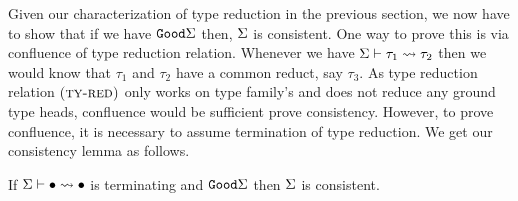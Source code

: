 \documentclass[format=acmsmall,manuscript,review,screen,nonacm,margin=1in,11pt]{acmart}
\begin{document}
Given our characterization of type reduction in the previous section, we now have to show
that if we have $\texttt{Good}\Sigma$ then, $\Sigma$ is consistent. One way to prove this is
via confluence of type reduction relation. Whenever we have $\Sigma \vdash \tau_1 \rightsquigarrow \tau_2$
then we would know that $\tau_1$ and $\tau_2$ have a common reduct, say $\tau_3$. As type reduction
relation $\textsc{(ty-red)}$ only works on type family's and does not reduce any ground type heads,
confluence would be sufficient prove consistency. However, to prove confluence, it is necessary to assume
termination of type reduction. We get our consistency lemma as follows.
\begin{lemma}[Consistency]
  If $\Sigma \vdash \bullet \rightsquigarrow \bullet$ is terminating and $\texttt{Good}\Sigma$ then $\Sigma$ is consistent.
\end{lemma}

\newcommand\SApp{
  \ib{\irule[\trule{s-app}]
    {\stepsto {\Tm_1} {\Tm'_1}};
    {\stepsto {\Tm_1\App\Tm_2} {\Tm'_1\App\Tm_2}}}
}
\newcommand\STApp{
  \ib{\irule[\trule{s-tapp}]
    {\stepsto {\Tm_1} {\Tm'_1}};
    {\stepsto {\Tm_1\App\tau} {\Tm'_1\App\tau}}}
}

\newcommand\SCApp{
  \ib{\irule[\trule{s-capp}]
    {\stepsto {\Tm_1} {\Tm'_1}};
    {\stepsto {\Tm_1\App\Co} {\Tm'_1\App\Co}}}
}

\newcommand\SCast{
  \ib{\irule[\trule{s-cast}]
    {\stepsto {\Tm_1} {\Tm'_1}};
    {\stepsto {\cast{\Tm_1}\Co} {\cast{\Tm'_1}\Co}}}
}

\newcommand\SBeta{
  \ib{\irule[\trule{s-$\beta$}];
    {\stepsto {(\Lam x \tau \Tm_1)\App\Tm_2} {\Tm_1[x/\Tm_2]}}
  }
}
\newcommand\STBeta{
  \ib{\irule[\trule{s-T$\beta$}];
    {\stepsto {(\TLam \alpha \Tm)\App\tau} {\Tm[\alpha/\tau]}}
  }
}

\newcommand\SPush{
  \ib{\irule[\trule{s-push}]
    {\Co_1 = \sym{\nth 0 \Co}}
    {\Co_2 = \nth 1 \Co};
    {\stepsto {(\cast {\Lam x \tau \Tm} \Co) \App \Tm_1} {\cast {(\Lam x \tau \Tm)\App(\cast{\Tm_1} {\Co_1})} {\Co_2}}}
  }
}
\newcommand\STPush{
  \ib{\irule[\trule{s-tpush}];
    {\stepsto {(\cast {\TLam \alpha \Tm} \Co) \App \tau} {\cast {(\TLam \alpha \Tm)\App\tau} {\Co@\tau}}}
  }
}
\newcommand\STrans{
  \ib{\irule[\trule{s-trans}];
    {\stepsto {\cast {(\cast \Tm \Co)} \MoreCo} {\cast \Tm {\comp\Co\MoreCo}}}
  }
  
}
\end{document}
